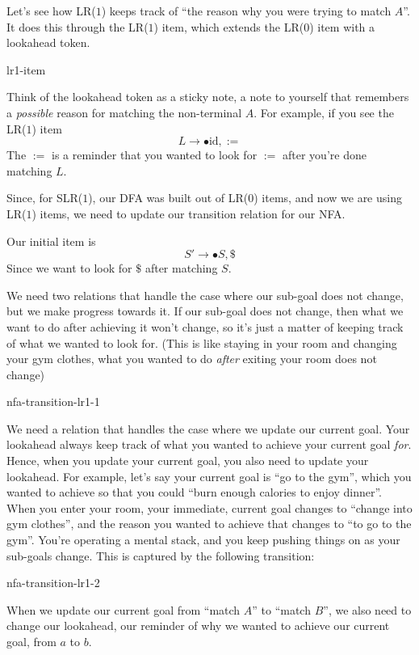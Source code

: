 Let's see how LR($1$) keeps track of ``the reason why you were trying to match $A$''. It does this through the LR($1$) item, which extends the LR($0$) item with a lookahead token. 

\begin{center}
    {lr1-item}
\end{center}

Think of the lookahead token as a sticky note, a note to yourself that remembers a \textit{possible} reason for matching the non-terminal $A$. For example, if you see the LR($1$) item 
\[L \to \bullet \text{id}, :=\]
The $:=$ is a reminder that you wanted to look for $:=$ after you're done matching $L$. 

Since, for SLR($1$), our DFA was built out of LR($0$) items, and now we are using LR($1$) items, we need to update our transition relation for our NFA. 

Our initial item is
\[S' \to \bullet S, \$\]
Since we want to look for $\$$ after matching $S$. 

We need two relations that handle the case where our sub-goal does not change, but we make progress towards it. If our sub-goal does not change, then what we want to do after achieving it won't change, so it's just a matter of keeping track of what we wanted to look for. (This is like staying in your room and changing your gym clothes, what you wanted to do \textit{after} exiting your room does not change)
\begin{center}
    {nfa-transition-lr1-1}
\end{center}

We need a relation that handles the case where we update our current goal. Your lookahead always keep track of what you wanted to achieve your current goal \textit{for}. Hence, when you update your current goal, you also need to update your lookahead. For example, let's say your current goal is ``go to the gym'', which you wanted to achieve so that you could ``burn enough calories to enjoy dinner''. When you enter your room, your immediate, current goal changes to ``change into gym clothes'', and the reason you wanted to achieve that changes to ``to go to the gym''. You're operating a mental stack, and you keep pushing things on as your sub-goals change. This is captured by the following transition:
\begin{center}
  {nfa-transition-lr1-2}
\end{center}

When we update our current goal from ``match $A$'' to ``match $B$'', we also need to change our lookahead, our reminder of why we wanted to achieve our current goal, from $a$ to $b$.

